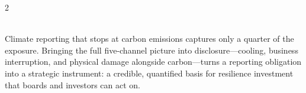 \begin{multicols}{2}
\vspace{1mm}

\\[0pt]
Climate reporting that stops at carbon emissions captures only a quarter of the exposure. Bringing the full five-channel picture into disclosure---cooling, business interruption, and physical damage alongside carbon---turns a reporting obligation into a strategic instrument: a credible, quantified basis for resilience investment that boards and investors can act on.

\end{multicols}
